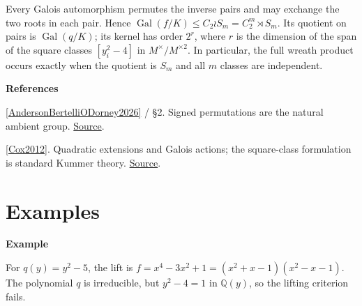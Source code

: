 \documentclass[11pt,a4paper,oneside,openany]{book}
\newcommand{\atlasdisplay}[1]{\par\begingroup\centering\vspace{3pt}\noindent\adjustbox{max width=\linewidth}{\(\displaystyle #1\)}\par\vspace{5pt}\endgroup}
\newenvironment{sources}{\par\smallskip\begingroup\footnotesize\color{atlasgray}\leftskip=10pt\setlength{\parskip}{2pt}}{\par\endgroup\smallskip}
\begin{document}
\atlasdisplay{L=M\bigl(\sqrt{y_1^2-4},\ldots,\sqrt{y_m^2-4}\bigr).}
\color{black} Every Galois automorphism permutes the inverse pairs and may exchange the two roots in each pair. Hence \(\operatorname{Gal}(f/K)\le C_2\wr S_m=C_2^m\rtimes S_m\). Its quotient on pairs is \(\operatorname{Gal}(q/K)\); its kernel has order \(2^r\), where \(r\) is the dimension of the span of the square classes \([y_i^2-4]\) in \(M^\times/M^{\times2}\). In particular, the full wreath product occurs exactly when the quotient is \(S_m\) and all \(m\) classes are independent.\par
\begin{sources}
\textbf{References}\par\smallskip
\noindent\hyperlink{ref:AndersonBertelliODorney2026}{[AndersonBertelliODorney2026]} / §2. Signed permutations are the natural ambient group. \href{https://arxiv.org/abs/2406.18970v2}{Source}.\par
\noindent\hyperlink{ref:Cox2012}{[Cox2012]}. Quadratic extensions and Galois actions; the square-class formulation is standard Kummer theory. \href{https://onlinelibrary.wiley.com/doi/book/10.1002/9781118218457}{Source}.\par
\end{sources}\color{black}
\section{Examples}

\begin{atlasblock}[standard]
\textbf{\sffamily Example}\par\smallskip
\color{black} For \(q(y)=y^2-5\), the lift is \(f=x^4-3x^2+1=(x^2+x-1)(x^2-x-1)\). The polynomial \(q\) is irreducible, but \(y^2-4=1\) in \(\mathbb Q(y)\), so the lifting criterion fails.\par
\end{atlasblock}\color{black}
\end{document}
